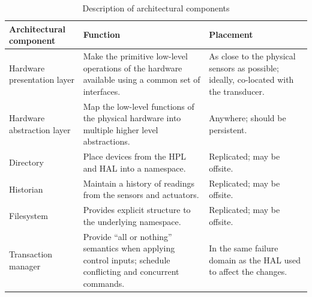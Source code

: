 
\begin{table}[htb]
\centering
\begin{tabularx}{\textwidth}{|l|X|X|}
\hline
Architectural component & Function & Placement \\
\hline
\hline
Hardware presentation layer & Make the primitive low-level operations of the hardware available using a common set of interfaces. & As close to the physical sensors as possible; ideally, co-located with the transducer.\\ 

Hardware abstraction layer & Map the low-level functions of the physical hardware into multiple higher level abstractions.  & Anywhere; should be persistent.\\

Directory & Place devices from the HPL and HAL into a namespace. & Replicated; may be offsite.\\

Historian & Maintain a history of readings from the sensors and actuators. & Replicated; may be offsite. \\

Filesystem & Provides explicit structure to the underlying namespace. & Replicated; may be offsite. \\

Transaction manager & Provide ``all or nothing'' semantics when applying control inputs; schedule conflicting and concurrent commands.  & In the same failure domain as the HAL used to affect the changes. \\

\hline
\end{tabularx}
\caption{Description of architectural components}
\end{table}

%

